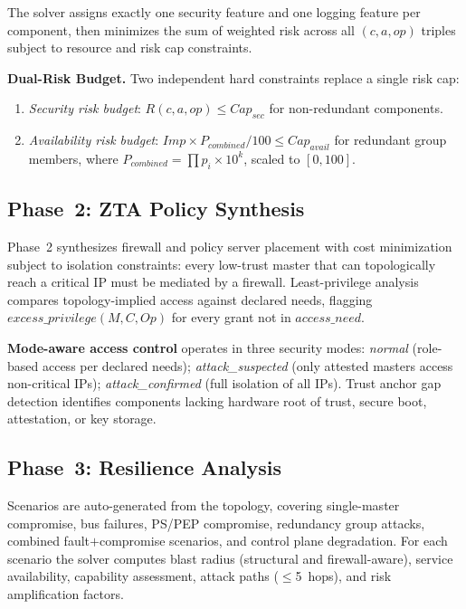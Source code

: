 \documentclass[conference]{IEEEtran}
\begin{document}
The solver assigns exactly one security feature and one logging feature per
component, then minimizes the sum of weighted risk across all
$(c, a, \mathit{op})$ triples subject to resource and risk cap constraints.

\textbf{Dual-Risk Budget.} Two independent hard constraints replace a single
risk cap:
\begin{enumerate}
\item \textit{Security risk budget}: $R(c,a,\mathit{op}) \le
  \mathit{Cap}_\mathit{sec}$ for non-redundant components.
\item \textit{Availability risk budget}: $\mathit{Imp} \times
  P_\mathit{combined} / 100 \le \mathit{Cap}_\mathit{avail}$ for redundant
  group members, where $P_\mathit{combined} = \prod p_i \times 10^k$,
  scaled to $[0,100]$.
\end{enumerate}

\subsection{Phase~2: ZTA Policy Synthesis}

Phase~2 synthesizes firewall and policy server placement with cost
minimization subject to isolation constraints: every low-trust master that
can topologically reach a critical IP must be mediated by a firewall.
Least-privilege analysis compares topology-implied access against declared
needs, flagging $\mathit{excess\_privilege}(M,C,\mathit{Op})$ for every
grant not in $\mathit{access\_need}$.

\textbf{Mode-aware access control} operates in three security modes:
\textit{normal} (role-based access per declared needs);
\textit{attack\_suspected} (only attested masters access non-critical IPs);
\textit{attack\_confirmed} (full isolation of all IPs).
Trust anchor gap detection identifies components lacking hardware root of
trust, secure boot, attestation, or key storage.

\subsection{Phase~3: Resilience Analysis}

Scenarios are auto-generated from the topology, covering single-master
compromise, bus failures, PS/PEP compromise, redundancy group attacks,
combined fault$+$compromise scenarios, and control plane degradation.
For each scenario the solver computes blast radius (structural and
firewall-aware), service availability, capability assessment,
attack paths ($\le$5~hops), and risk amplification factors.
\end{document}
